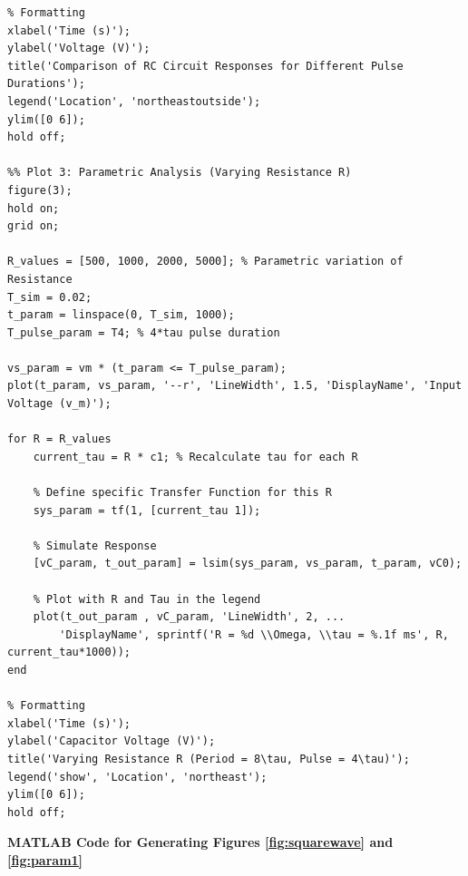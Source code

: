 \documentclass[12pt]{article}
\begin{document}
\begin{verbatim}
% Formatting
xlabel('Time (s)');
ylabel('Voltage (V)');
title('Comparison of RC Circuit Responses for Different Pulse Durations');
legend('Location', 'northeastoutside');
ylim([0 6]);
hold off;

%% Plot 3: Parametric Analysis (Varying Resistance R)
figure(3);
hold on; 
grid on;

R_values = [500, 1000, 2000, 5000]; % Parametric variation of Resistance
T_sim = 0.02; 
t_param = linspace(0, T_sim, 1000);
T_pulse_param = T4; % 4*tau pulse duration

vs_param = vm * (t_param <= T_pulse_param);
plot(t_param, vs_param, '--r', 'LineWidth', 1.5, 'DisplayName', 'Input Voltage (v_m)');

for R = R_values
    current_tau = R * c1; % Recalculate tau for each R 
    
    % Define specific Transfer Function for this R
    sys_param = tf(1, [current_tau 1]);
    
    % Simulate Response
    [vC_param, t_out_param] = lsim(sys_param, vs_param, t_param, vC0);
    
    % Plot with R and Tau in the legend
    plot(t_out_param , vC_param, 'LineWidth', 2, ...
        'DisplayName', sprintf('R = %d \\Omega, \\tau = %.1f ms', R, current_tau*1000));
end

% Formatting
xlabel('Time (s)');
ylabel('Capacitor Voltage (V)');
title('Varying Resistance R (Period = 8\tau, Pulse = 4\tau)');
legend('show', 'Location', 'northeast');
ylim([0 6]);
hold off;
\end{verbatim}
\textbf{MATLAB Code for Generating Figures \ref{fig:squarewave} and \ref{fig:param1}}
\end{document}
